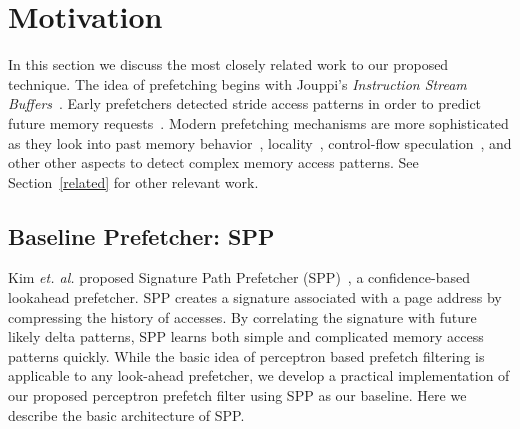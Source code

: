 \section{Motivation}
\label{Background}

In this section we discuss the most closely related work to our
proposed technique.  The idea of prefetching begins with Jouppi's
\textit{Instruction Stream Buffers}~\cite{ISB}. Early prefetchers
detected stride access patterns in order to predict future memory
requests~\cite{Smith,Baer,Stride}. Modern prefetching mechanisms are
more sophisticated as they look into past memory
behavior~\cite{Address_Correlated,AMPM},
locality~\cite{Spatial_Pattern,SMS,Temporal_Instruction_Fetch,Off_Chip,STMS,SMS_JILP},
control-flow speculation~\cite{BFetch,MTBFetch}, and other other
aspects to detect complex memory access patterns.  See
Section~\ref{related} for other relevant work.


\subsection{Baseline Prefetcher: SPP}
\label{Background-SPP}

Kim {\em et. al.} proposed Signature Path Prefetcher (SPP)~\cite{SPP},
a confidence-based lookahead prefetcher.  SPP creates a signature
associated with a page address by compressing the history of
accesses. By correlating the signature with future likely delta
patterns, SPP learns both simple and complicated memory access
patterns quickly.  While the basic idea of perceptron based prefetch
filtering is applicable to any look-ahead prefetcher, we develop a
practical implementation of our proposed perceptron prefetch filter
using SPP as our baseline.  Here we describe the basic architecture of
SPP.

